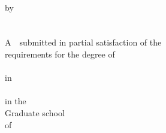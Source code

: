 {\begin{titlepage}
\setlength{\@title@width}{6.8cm}
  {
  \begin{spacing}{2}
  \xiaosi
   \noindent
   \end{spacing}
    }

\clearpage
\thispagestyle{empty} %

\begin{center}
\qquad\\
 \begin{spacing}{2.5}
 \xiaosan \@etitle

 \end{spacing}



 \begin{spacing}{2}
 \xiaosi
 by\\
 \@ename \\
 \@cbe\\
 A~\@cdegree~submitted in partial satisfaction of the\\
 requirements for the degree of\\
 \@cclass\\
 in\\
\@emajor\\
in the\\
Graduate school\\
 of\\
 \@ehnu\\


\end{spacing}
\end{center}
\end{titlepage}}
